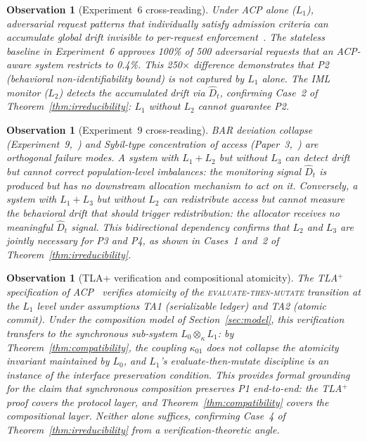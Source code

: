 \documentclass[11pt]{article}
\newtheorem{observation}[theorem]{Observation}
\newcommand{\Dhat}{\widehat{D}}
\newcommand{\Layer}[1]{L_{#1}}
\newcommand{\Comp}{\otimes_\kappa}
\begin{document}
\begin{observation}[Experiment~6 cross-reading]
\label{obs:exp6}
Under ACP alone ($\Layer{1}$), adversarial request patterns that individually
satisfy admission criteria can accumulate global drift invisible to
per-request enforcement~\cite{fernandez2026b}. The stateless baseline in
Experiment~6 approves 100\% of 500 adversarial requests that an ACP-aware
system restricts to 0.4\%. This 250$\times$ difference demonstrates that P2
(behavioral non-identifiability bound) is not captured by $\Layer{1}$ alone.
The IML monitor ($\Layer{2}$) detects the accumulated drift via $\Dhat_t$,
confirming Case~2 of Theorem~\ref{thm:irreducibility}: $\Layer{1}$ without
$\Layer{2}$ cannot guarantee P2.
\end{observation}

\begin{observation}[Experiment~9 cross-reading]
\label{obs:exp9}
BAR deviation collapse (Experiment~9,~\cite{fernandez2026b}) and Sybil-type
concentration of access (Paper~3,~\cite{fairgov26}) are orthogonal failure
modes. A system with $\Layer{1}+\Layer{2}$ but without $\Layer{3}$ can detect
drift but cannot correct population-level imbalances: the monitoring signal
$\Dhat_t$ is produced but has no downstream allocation mechanism to act on it.
Conversely, a system with $\Layer{1}+\Layer{3}$ but without $\Layer{2}$ can
redistribute access but cannot measure the behavioral drift that should trigger
redistribution: the allocator receives no meaningful $\Dhat_t$ signal. This
bidirectional dependency confirms that $\Layer{2}$ and $\Layer{3}$ are jointly
necessary for P3 and P4, as shown in Cases~1 and~2 of
Theorem~\ref{thm:irreducibility}.
\end{observation}

\begin{observation}[TLA+ verification and compositional atomicity]
\label{obs:tla}
The TLA$^+$ specification of ACP~\cite{fernandez2026b} verifies atomicity of
the \textsc{evaluate-then-mutate} transition at the $\Layer{1}$ level under
assumptions TA1 (serializable ledger) and TA2 (atomic commit). Under the
composition model of Section~\ref{sec:model}, this verification transfers to
the synchronous sub-system $\Layer{0} \Comp \Layer{1}$: by
Theorem~\ref{thm:compatibility}, the coupling $\kappa_{01}$ does not collapse
the atomicity invariant maintained by $\Layer{0}$, and $\Layer{1}$'s
evaluate-then-mutate discipline is an instance of the interface preservation
condition. This provides formal grounding for the claim that synchronous
composition preserves P1 end-to-end: the TLA$^+$ proof covers the protocol
layer, and Theorem~\ref{thm:compatibility} covers the compositional layer.
Neither alone suffices, confirming Case~4 of
Theorem~\ref{thm:irreducibility} from a verification-theoretic angle.
\end{observation}
\end{document}
